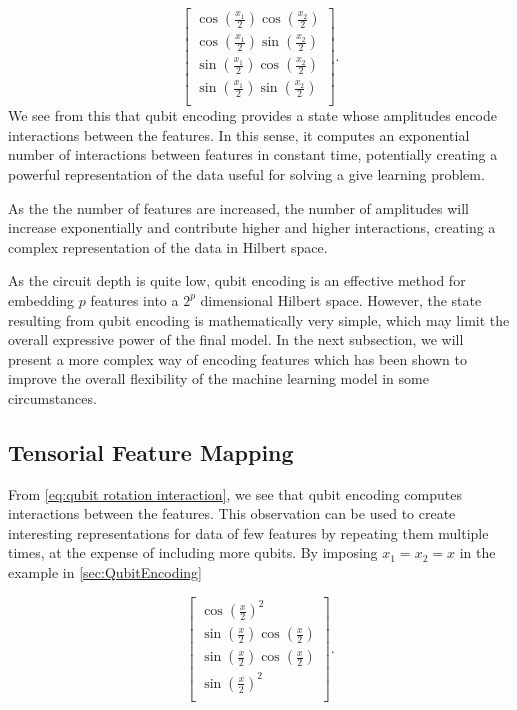 \begin{equation}\label{eq:qubit rotation interaction}
\begin{bmatrix}
    \cos(\frac{x_1}{2})\cos(\frac{x_2}{2}) \\
    \cos(\frac{x_1}{2})\sin(\frac{x_2}{2}) \\
    \sin(\frac{x_1}{2})\cos(\frac{x_2}{2}) \\
    \sin(\frac{x_1}{2})\sin(\frac{x_2}{2}) \\
    \end{bmatrix}.
\end{equation}
We see from this that qubit encoding provides a state whose amplitudes encode interactions between the features. In this sense, it computes an exponential number of interactions between features in constant time, potentially creating a powerful representation of the data useful for solving a give learning problem.


As the the number of features are increased, the number of amplitudes will increase exponentially and contribute higher and higher interactions, creating a complex representation of the data in Hilbert space. 

As the circuit depth is quite low, qubit encoding is an effective method for embedding $p$ features into a $2^p$ dimensional Hilbert space. However, the state resulting from qubit encoding is mathematically very simple, which may limit the overall expressive power of the final model. In the next subsection, we will present a more complex way of encoding features which has been shown to improve the overall flexibility of the machine learning model in some circumstances. 


\subsection{Tensorial Feature Mapping}\label{sec:Tensorial Feature Mapping}

From \autoref{eq:qubit rotation interaction}, we see that qubit encoding computes interactions between the features. This observation can be used to create interesting representations for data of few features by repeating them multiple times, at the expense of including more qubits. By imposing $x_1 = x_2 = x$ in the example in \autoref{sec:QubitEncoding}

\begin{equation}\label{eq:tensorial feature mapping}
\begin{bmatrix}
    \cos(\frac{x}{2})^2 \\
    \sin(\frac{x}{2})\cos(\frac{x}{2}) \\
    \sin(\frac{x}{2})\cos(\frac{x}{2}) \\
    \sin(\frac{x}{2})^2 \\
    \end{bmatrix}.
\end{equation}

